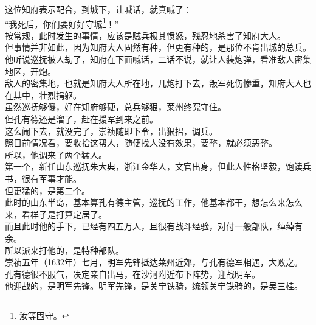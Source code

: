 \begin{multicols}{\theparacolNo}
这位知府表示配合，到城下，让喊话，就真喊了：\\

“我死后，你们要好好守城\footnote{汝等固守。}！”\\

按常规，此时发生的事情，应该是贼兵极其愤怒，残忍地杀害了知府大人。\\

但事情并非如此，因为知府大人固然有种，但更有种的，是那位不肯出城的总兵。\\

他听说巡抚被人劫了，知府在下面喊话，二话不说，就让人装炮弹，看准敌人密集地区，开炮。\\

敌人的密集地，也就是知府大人所在地，几炮打下去，叛军死伤惨重，知府大人也在其中，壮烈捐躯。\\

虽然巡抚够傻，好在知府够硬，总兵够狠，莱州终究守住。\\

但孔有德还是溜了，赶在援军到来之前。\\

这么闹下去，就没完了，崇祯随即下令，出狠招，调兵。\\

照目前情况看，要收拾这帮人，随便找人没有效果，要整，就必须恶整。\\

所以，他调来了两个猛人。\\

第一个，新任山东巡抚朱大典，浙江金华人，文官出身，但此人性格坚毅，饱读兵书，很有军事才能。\\

但更猛的，是第二个。\\

此时的山东半岛，基本算孔有德主管，巡抚的工作，他基本都干，想怎么来怎么来，看样子是打算定居了。\\

而且此时他的手下，已经有四五万人，且很有战斗经验，对付一般部队，绰绰有余。\\

所以派来打他的，是特种部队。\\

崇祯五年（1632年）七月，明军先锋抵达莱州近郊，与孔有德军相遇，大败之。\\

孔有德很不服气，决定亲自出马，在沙河附近布下阵势，迎战明军。\\

他迎战的，是明军先锋。明军先锋，是关宁铁骑，统领关宁铁骑的，是吴三桂。\\


\end{multicols}
